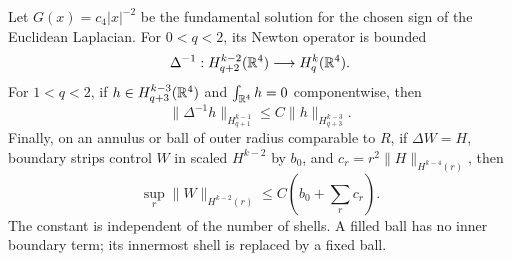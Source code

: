 \begin{lemma}
\label{collar:newton}
Let \(G(x)=c_4|x|^{-2}\) be the fundamental solution for the chosen
sign of the Euclidean Laplacian.
For \(0<q<2\), its Newton operator is bounded
\[
 \Delta^{-1}:H^{k-2}_{q+2}(\mathbb{R}^4)\longrightarrow H^k_q(\mathbb{R}^4).
\]
For \(1<q<2\), if \(h\in H^{k-3}_{q+3}(\mathbb{R}^4)\) and
\(\int_{\mathbb{R}^4}h=0\) componentwise, then
\begin{equation}
 \|\Delta^{-1}h\|_{H^{k-1}_{q+1}}
             \le C\|h\|_{H^{k-3}_{q+3}}.
 \label{collar:zero-mass-newton}
\end{equation}
Finally, on an annulus or ball of outer radius comparable to \(R\),
if \(\Delta W=H\), boundary strips control \(W\) in scaled
\(H^{k-2}\) by \(b_0\), and
\(c_r=r^2\|H\|_{H^{k-4}(r)}\), then
\begin{equation}
 \sup_r\|W\|_{H^{k-2}(r)}\le C\left(b_0+\sum_rc_r\right).
 \label{collar:green-sum}
\end{equation}
The constant is independent of the number of shells.  A filled ball
has no inner boundary term; its innermost shell is replaced by a
fixed ball.
\end{lemma}

